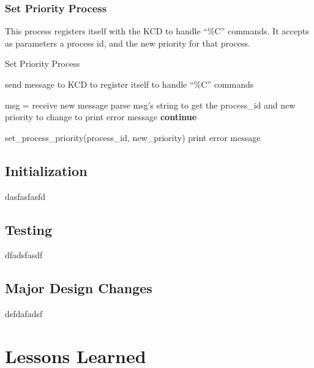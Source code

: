 \documentclass[12pt]{report}
\begin{document}
\subsection{Set Priority Process}

This process registers itself with the KCD to handle ``\%C'' commands. It accepts as parameters a process id, and the new priority for that process.

\begin{algorithm}[H]
	\caption{Set Priority Process}
	\begin{algorithmic}[1]
	  	\State send message to KCD to register itself to handle ``\%C'' commands

	  		\State msg = receive new message
	  		\State parse msg's string to get the process_id and new priority to change to
	  			\State print error message
	  			\State \textbf{continue}
	  		\EndIf

	  		\State set_process_priority(process_id, new_priority)
	  			\State print error message
	  		\EndIf
	  	\EndWhile
	  \EndFunction
	\end{algorithmic}
\end{algorithm}



\section{Initialization}

dasfasfasfd

\section{Testing}

dfadsfasdf

\section{Major Design Changes}

dsfdafadsf

\chapter{Lessons Learned}
\end{document}
